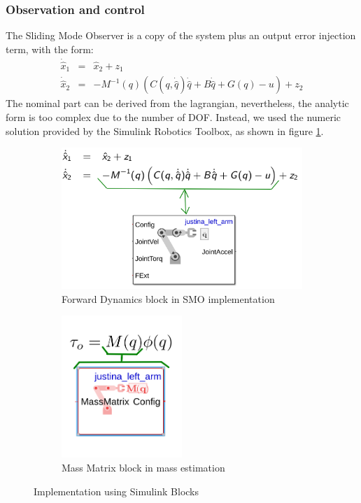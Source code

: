 \documentclass[a4paper, 10pt]{article}
\begin{document}
\subsubsection*{Observation and control}
The Sliding Mode Observer is a copy of the system plus an output error injection term, with the form:
\begin{eqnarray}
  \dot{\hat{x}}_1 &=& \hat{x}_2 + z_1\label{eq:observer1}\\
  \dot{\hat{x}}_2 &=& -M^{-1}(q)\left(C(q, \dot{\hat{q}})\dot{\hat{q}} + B\dot{\hat{q}} + G(q) - u\right) + z_2\label{eq:observer2}
\end{eqnarray}
  The nominal part can be derived from the lagrangian, nevertheless, the analytic form is too complex due to the number of DOF. Instead, we used the numeric solution provided by the Simulink Robotics Toolbox, as shown in figure \ref{fig:SimulinkSMO}.
\begin{figure}[h!]
  \centering
  \begin{subfigure}{0.45\textwidth}
  \centering
  \includegraphics[width=\textwidth]{Figures/SMOwithSimulink.png}
  \caption{Forward Dynamics block in SMO implementation}
  \label{fig:SimulinkSMO}
  \end{subfigure}
  \begin{subfigure}{0.45\textwidth}
  \centering
  \includegraphics[width=0.5\textwidth]{Figures/MassEst.png}
  \caption{Mass Matrix block in mass estimation}
  \label{fig:SimulinkMassEst}
  \end{subfigure}
  \caption{Implementation using Simulink Blocks}
\end{figure}
  
\end{document}
